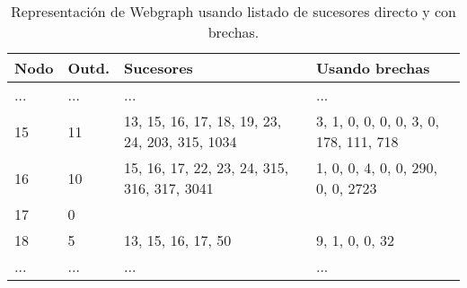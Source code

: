  \begin{table}%
\caption{Representación de Webgraph usando listado de sucesores directo y con brechas.}
\label{table:webgraph1}
\centering
\scriptsize

\begin{tabular}{|l|l|l|l|}
	\toprule
	Nodo & Outd. & Sucesores & Usando brechas \\
	\midrule
	... & ... & ... & ... \\
	15 & 11 & 13, 15, 16, 17, 18, 19, 23, 24, 203, 315, 1034 & 3, 1, 0, 0, 0, 0, 3, 0, 178, 111, 718 \\
	16 & 10 & 15, 16, 17, 22, 23, 24, 315, 316, 317, 3041 & 1, 0, 0, 4, 0, 0, 290, 0, 0, 2723 \\
	17 & 0 &  &  \\
	18 & 5 & 13, 15, 16, 17, 50 & 9, 1, 0, 0, 32 \\
	... & ... & ... & ... \\
\end{tabular}
\end{table} 
